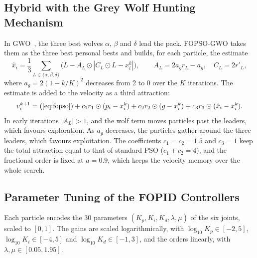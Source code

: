 \documentclass{svproc}
\begin{document}
\subsection{Hybrid with the Grey Wolf Hunting Mechanism}

In GWO~\cite{mirjalili2014}, the three best wolves $\alpha$, $\beta$ and $\delta$ lead the
pack. FOPSO-GWO takes them as the three best personal bests and builds, for each particle,
the estimate
\begin{equation}
  \hat x_i = \frac{1}{3} \sum_{L \in \{\alpha, \beta, \delta\}}
             \big( L - A_L \odot |C_L \odot L - x_i^k| \big),
  \qquad A_L = 2 a_g r_L - a_g, \quad C_L = 2 r'_L ,
  \label{eq:gwo}
\end{equation}
where $a_g = 2(1 - k/K)^2$ decreases from 2 to 0 over the $K$ iterations. The estimate is
added to the velocity as a third attraction:
\begin{equation}
  v_i^{k+1} = \text{(\ref{eq:fopso})} + c_1 r_1 \odot (p_i - x_i^k) + c_2 r_2 \odot (g - x_i^k)
              + c_3 r_3 \odot (\hat x_i - x_i^k).
  \label{eq:velocity}
\end{equation}
In early iterations $|A_L| > 1$, and the wolf term moves particles past the leaders, which
favours exploration. As $a_g$ decreases, the particles gather around the three leaders,
which favours exploitation. The coefficients $c_1 = c_2 = 1.5$ and $c_3 = 1$ keep the total
attraction equal to that of standard PSO ($c_1 + c_2 = 4$), and the fractional order is fixed
at $a = 0.9$, which keeps the velocity memory over the whole search.

\subsection{Parameter Tuning of the FOPID Controllers}

Each particle encodes the 30 parameters $(K_p, K_i, K_d, \lambda, \mu)$ of the six joints,
scaled to $[0,1]$. The gains are scaled logarithmically, with $\log_{10} K_p \in [-2, 5]$,
$\log_{10} K_i \in [-4, 5]$ and $\log_{10} K_d \in [-1, 3]$, and the orders linearly, with
$\lambda, \mu \in [0.05, 1.95]$.
\end{document}
